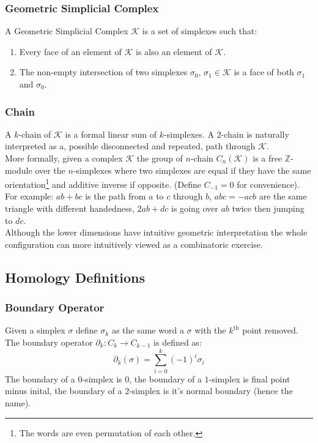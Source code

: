\subsubsection{Geometric Simplicial Complex}
A Geometric Simplicial Complex $\mathcal{K}$ is a set of simplexes such that:
\begin{enumerate}
	\item Every face of an element of $\mathcal{K}$ is also an element of $\mathcal{K}$.
	\item The non-empty intersection of two simplexes $\sigma_0,\,\sigma_1\in\mathcal{K}$ is a face of both $\sigma_1$ and $\sigma_0$.
\end{enumerate}

\subsubsection{Chain}
A $k$-chain of $\mathcal{K}$ is a formal linear sum of $k$-simplexes.
A $2$-chain is naturally interpreted as a,
possible disconnected and repeated, 
path through $\mathcal{K}$.
\\

More formally, 
given a complex $\mathcal{K}$ the group of $n$-chain $C_n(\mathcal{K})$ is a free $\mathbb{Z}$-module over the $n$-simplexes where two simplexes are equal if they have the same orientation\footnote{The words are even permutation of each other.} and additive inverse if opposite.
(Define $C_{-1} = 0$ for convenience).
\\

For example: $ab+bc$ is the path from $a$ to $c$ through $b$,
$abc = -acb$ are the same triangle with different handedness,
$2ab+dc$ is going over $ab$ twice then jumping to $dc$.
\\

Although the lower dimensions have intuitive geometric interpretation the whole configuration can more intuitively viewed as a combinatoric exercise. 

\subsection{Homology Definitions}
\subsubsection{Boundary Operator}
Given a simplex $\sigma$ define $\sigma_k$ as the same word a $\sigma$ with the $k^\text{th}$ point removed.
The boundary operator $\partial_k:C_k\rightarrow C_{k-1}$ is defined as:
\[\partial_k(\sigma) = \sum_{i=0}^k(-1)^i\sigma_i\]
The boundary of a $0$-simplex is $0$,
the boundary of a $1$-simplex is final point minus inital,
the boundary of a $2$-simplex is it's normal boundary (hence the name).
\\

